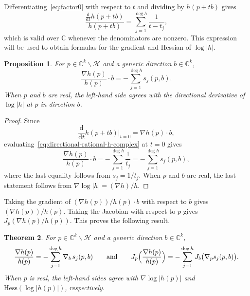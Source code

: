 \documentclass[11pt]{article}
\numberwithin{equation}{section}
\theoremstyle{plain}
\newtheorem{theorem}{Theorem}[section]
\newtheorem{proposition}[theorem]{Proposition}
\theoremstyle{definition}
\theoremstyle{remark}
\newcommand{\sH}{{\mathcal H}}
\newcommand\bC{{\mathbb C}}
\begin{document}
Differentiating~\eqref{eq:factor0} with respect to $t$ and dividing by $h(p+tb)$ gives
\begin{equation}\label{eq:directional-rational-h-complex}
    \frac{\frac{\mathrm{d}}{\mathrm{d}t}h(p+tb)}{h(p+tb)} = \sum_{j=1}^{\deg h}\frac{1}{t-t_{j}},
\end{equation}
which is valid over $\bC$ whenever the denominators are nonzero. This expression will be used to obtain formulas for the gradient and Hessian of $\log |h|$. 

\begin{proposition}
\label{prop:gradient}
For $p\in \bC^{k}\smallsetminus\sH$ and a generic direction $b \in \bC^{k}$,
\begin{equation*}
    \frac{\nabla h(p)}{h(p)} \cdot b = -\sum_{j=1}^{\deg h}s_{j}(p,b).
\end{equation*}
When $p$ and $b$ are real, the left-hand side agrees with the directional derivative of $\log \lvert h\rvert$ at $p$ in direction $b$.
\end{proposition}

\begin{proof}
Since 
\begin{equation*}
\frac{\mathrm{d}}{\mathrm{d}t} h(p +tb)\vert_{t=0} = \nabla h(p)\cdot b,
\end{equation*}
evaluating~\eqref{eq:directional-rational-h-complex} at $t=0$ gives
\begin{equation*}
\frac{\nabla h(p)}{h(p)}\cdot b = -\sum_{j=1}^{\deg h}\frac{1}{t_{j}} = -\sum_{j=1}^{\deg h}s_{j}(p,b),
\end{equation*}
where the last equality follows from $s_j = 1/t_j$. When $p$ and $b$ are real, the last statement follows from $\nabla \log\lvert h\rvert = (\nabla h)/h$.
\end{proof}

Taking the gradient of $(\nabla h(p))/h(p)\cdot b$ with respect to $b$ gives $(\nabla h(p))/h(p)$. Taking the Jacobian with respect to $p$ gives $J_{p}(\nabla h(p)/h(p))$. This proves the following result.

\begin{theorem}\label{thm:gradient_and_hessian}
For $p\in \bC^{k}\smallsetminus \sH$ and a generic direction $b\in \bC^{k}$,
\begin{equation*}
\frac{\nabla h(p)}{h(p)} = -\sum_{j=1}^{\deg h} \nabla_b\, s_{j}(p,b)\qquad\text{and}\qquad J_{p}\Bigl(\frac{\nabla h(p)}{h(p)}\Bigr)= -\sum_{j=1}^{\deg h}J_b\bigl(\nabla_{p} s_{j}(p,b)\bigr).
\end{equation*}
When $p$ is real, the left-hand sides agree with $\nabla \log \lvert h(p)\rvert$ and $\mathrm{Hess}(\log \lvert h(p)\rvert)$, respectively.
\end{theorem}
\end{document}
